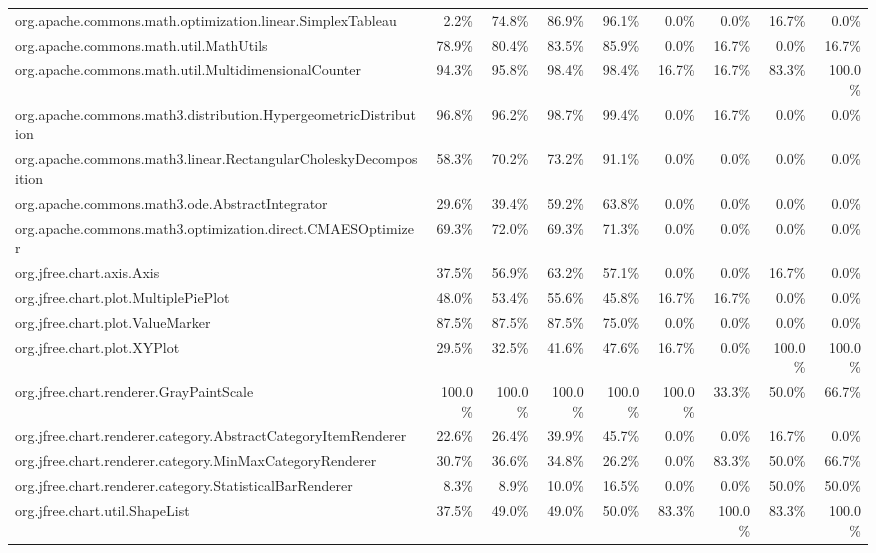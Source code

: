 \begin{tabular}{ l rrrr rrrr}
org.apache.commons.math.optimization.linear.SimplexTableau &  2.2\% &  74.8\% &  86.9\% &  96.1\% &  0.0\% &  0.0\% &  16.7\% &  0.0\%\\ 
org.apache.commons.math.util.MathUtils &  78.9\% &  80.4\% &  83.5\% &  85.9\% &  0.0\% &  16.7\% &  0.0\% &  16.7\%\\ 
org.apache.commons.math.util.MultidimensionalCounter &  94.3\% &  95.8\% &  98.4\% &  98.4\% &  16.7\% &  16.7\% &  83.3\% &  100.0\%\\ 
org.apache.commons.math3.distribution.HypergeometricDistribution &  96.8\% &  96.2\% &  98.7\% &  99.4\% &  0.0\% &  16.7\% &  0.0\% &  0.0\%\\ 
org.apache.commons.math3.linear.RectangularCholeskyDecomposition &  58.3\% &  70.2\% &  73.2\% &  91.1\% &  0.0\% &  0.0\% &  0.0\% &  0.0\%\\ 
org.apache.commons.math3.ode.AbstractIntegrator &  29.6\% &  39.4\% &  59.2\% &  63.8\% &  0.0\% &  0.0\% &  0.0\% &  0.0\%\\ 
org.apache.commons.math3.optimization.direct.CMAESOptimizer &  69.3\% &  72.0\% &  69.3\% &  71.3\% &  0.0\% &  0.0\% &  0.0\% &  0.0\%\\ 
org.jfree.chart.axis.Axis &  37.5\% &  56.9\% &  63.2\% &  57.1\% &  0.0\% &  0.0\% &  16.7\% &  0.0\%\\ 
org.jfree.chart.plot.MultiplePiePlot &  48.0\% &  53.4\% &  55.6\% &  45.8\% &  16.7\% &  16.7\% &  0.0\% &  0.0\%\\ 
org.jfree.chart.plot.ValueMarker &  87.5\% &  87.5\% &  87.5\% &  75.0\% &  0.0\% &  0.0\% &  0.0\% &  0.0\%\\ 
org.jfree.chart.plot.XYPlot &  29.5\% &  32.5\% &  41.6\% &  47.6\% &  16.7\% &  0.0\% &  100.0\% &  100.0\%\\ 
org.jfree.chart.renderer.GrayPaintScale &  100.0\% &  100.0\% &  100.0\% &  100.0\% &  100.0\% &  33.3\% &  50.0\% &  66.7\%\\ 
org.jfree.chart.renderer.category.AbstractCategoryItemRenderer &  22.6\% &  26.4\% &  39.9\% &  45.7\% &  0.0\% &  0.0\% &  16.7\% &  0.0\%\\ 
org.jfree.chart.renderer.category.MinMaxCategoryRenderer &  30.7\% &  36.6\% &  34.8\% &  26.2\% &  0.0\% &  83.3\% &  50.0\% &  66.7\%\\ 
org.jfree.chart.renderer.category.StatisticalBarRenderer &  8.3\% &  8.9\% &  10.0\% &  16.5\% &  0.0\% &  0.0\% &  50.0\% &  50.0\%\\ 
org.jfree.chart.util.ShapeList &  37.5\% &  49.0\% &  49.0\% &  50.0\% &  83.3\% &  100.0\% &  83.3\% &  100.0\%\\ 

\end{tabular}
